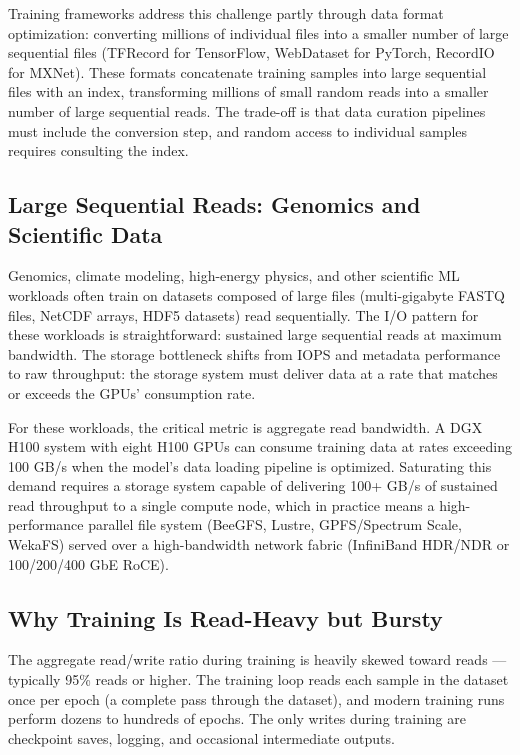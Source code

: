 Training frameworks address this challenge partly through data format optimization: converting millions of individual files into a smaller number of large sequential files (TFRecord for TensorFlow, WebDataset for PyTorch, RecordIO for MXNet). These formats concatenate training samples into large sequential files with an index, transforming millions of small random reads into a smaller number of large sequential reads. The trade-off is that data curation pipelines must include the conversion step, and random access to individual samples requires consulting the index.

\subsection{Large Sequential Reads: Genomics and Scientific Data}

Genomics, climate modeling, high-energy physics, and other scientific ML workloads often train on datasets composed of large files (multi-gigabyte FASTQ files, NetCDF arrays, HDF5 datasets) read sequentially. The I/O pattern for these workloads is straightforward: sustained large sequential reads at maximum bandwidth. The storage bottleneck shifts from IOPS and metadata performance to raw throughput: the storage system must deliver data at a rate that matches or exceeds the GPUs' consumption rate.

For these workloads, the critical metric is aggregate read bandwidth. A DGX H100 system with eight H100 GPUs can consume training data at rates exceeding 100 GB/s when the model's data loading pipeline is optimized. Saturating this demand requires a storage system capable of delivering 100+ GB/s of sustained read throughput to a single compute node, which in practice means a high-performance parallel file system (BeeGFS, Lustre, GPFS/Spectrum Scale, WekaFS) served over a high-bandwidth network fabric (InfiniBand HDR/NDR or 100/200/400 GbE RoCE).

\subsection{Why Training Is Read-Heavy but Bursty}

The aggregate read/write ratio during training is heavily skewed toward reads --- typically 95\% reads or higher. The training loop reads each sample in the dataset once per epoch (a complete pass through the dataset), and modern training runs perform dozens to hundreds of epochs. The only writes during training are checkpoint saves, logging, and occasional intermediate outputs.

